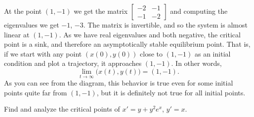 \begin{exampleSol}
At the point $(1,-1)$ we get the matrix
$\left[ \begin{smallmatrix} -2 & -1 \\ -1 & -2 \end{smallmatrix} \right]$ and
computing the eigenvalues we get $-1$, $-3$.
The matrix is invertible, and so the system is almost linear at $(1,-1)$.
As we have real eigenvalues and both negative, the critical
point is a sink, and therefore an asymptotically stable equilibrium point.
That is, if we start with any point $(x(0),y(0))$ close to $(1,-1)$ as
an initial condition and plot a trajectory, it approaches $(1,-1)$.
In other words,
\begin{equation*}
\lim_{t \to \infty} \bigl( x(t), y(t) \bigr) = (1,-1) .
\end{equation*}
As you can 
see from the diagram, this behavior is true even for some
initial points quite far from $(1,-1)$, but it is definitely not true for all
initial points.
\end{exampleSol}

\begin{example} \label{example:nlin-withexp}
Find and analyze the critical points of 
$x'=y+y^2e^x$,
$y'=x$.
\end{example}

